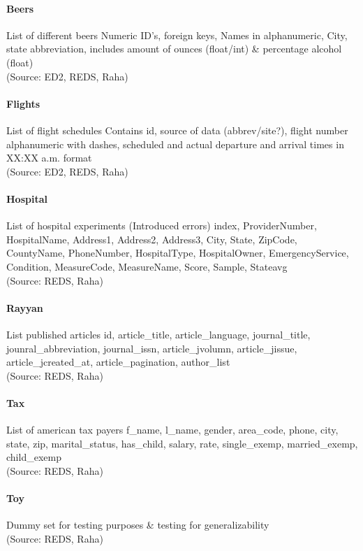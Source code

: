 \paragraph{Beers} 
List of different beers
Numeric ID's, foreign keys, Names in alphanumeric, City, state abbreviation, includes amount of ounces (float/int) \& percentage alcohol (float)
\\(Source: ED2, REDS, Raha)

\paragraph{Flights}
List of flight schedules
Contains id, source of data (abbrev/site?), flight number alphanumeric with dashes, scheduled and actual departure and arrival times in XX:XX a.m. format
\\(Source: ED2, REDS, Raha)

\paragraph{Hospital}
List of hospital experiments (Introduced errors)
index, ProviderNumber, HospitalName, Address1, Address2, Address3, City, State, ZipCode, CountyName, PhoneNumber, HospitalType, HospitalOwner, EmergencyService, Condition, MeasureCode, MeasureName, Score, Sample, Stateavg
\\(Source: REDS, Raha)

\paragraph{Rayyan}
List published articles
id, article\_title, article\_language, journal\_title, jounral\_abbreviation, journal\_issn, article\_jvolumn, article\_jissue, article\_jcreated\_at, article\_pagination, author\_list
\\(Source: REDS, Raha)

\paragraph{Tax}
List of american tax payers
f\_name, l\_name, gender, area\_code, phone, city, state, zip, marital\_status, has\_child, salary, rate, single\_exemp, married\_exemp, child\_exemp
\\(Source: REDS, Raha)

\paragraph{Toy}
Dummy set for testing purposes \& testing for generalizability
\\(Source: REDS, Raha)

